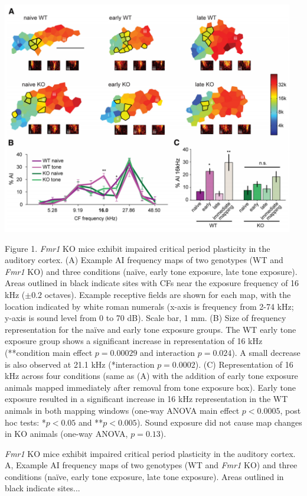 \centerline{\includegraphics[height=4in]{images/C2F1}}

\begin{changemargin}{1in}{1in}
\footnotesize{Figure 1. \textit{Fmr1} KO mice exhibit impaired critical period plasticity in the auditory cortex. (A) Example AI frequency maps of two genotypes (WT and \textit{Fmr1} KO) and three conditions (na\"ive, early tone exposure, late tone exposure). Areas outlined in black indicate sites with CFs near the exposure frequency of 16 kHz ($\pm0.2$ octaves). Example receptive fields are shown for each map, with the location indicated by white roman numerals (x-axis is frequency from 2-74 kHz; y-axis is sound level from 0 to 70 dB). Scale bar, 1 mm. (B) Size of frequency representation for the na\"ive and early tone exposure groups. The WT early tone exposure group shows a significant increase in representation of 16 kHz (**condition main effect $p=0.00029$ and interaction $p=0.024$). A small decrease is also observed at 21.1 kHz (*interaction $p=0.0002$). (C) Representation of 16 kHz across four conditions (same as (A) with the addition of early tone exposure animals mapped immediately after removal from tone exposure box). Early tone exposure resulted in a significant increase in 16 kHz representation in the WT animals in both mapping windows (one-way ANOVA main effect $p<0.0005$, post hoc tests: *$p<0.05$ and **$p<0.005$). Sound exposure did not cause map changes in KO animals (one-way ANOVA, $p=0.13$).}
\end{changemargin}


\textit{Fmr1} KO mice exhibit impaired critical period plasticity in the auditory cortex. A, Example AI frequency maps of two genotypes (WT and \textit{Fmr1} KO) and three conditions (na\"ive, early tone exposure, late tone exposure). Areas outlined in black indicate sites...

